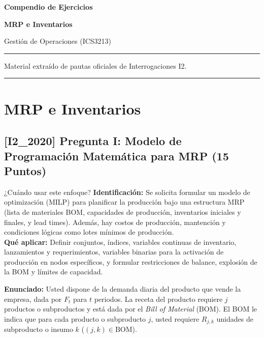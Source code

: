 \documentclass[11pt, a4paper]{article}
\begin{document}
\begin{titlepage}
  \centering
  \vspace*{2cm}
  {\Huge\bfseries\color{gopcyan} Compendio de Ejercicios\par}
  \vspace{0.4cm}
  {\LARGE\bfseries MRP e Inventarios\par}
  \vspace{0.3cm}
  {\large Gestión de Operaciones (ICS3213)\par}
  \vspace{1.2cm}
  \rule{\textwidth}{0.4pt}
  \vspace{0.4cm}
  {\small Material extraído de pautas oficiales de Interrogaciones I2.\par}
  \vspace{0.4cm}
  \rule{\textwidth}{0.4pt}
  \vfill
\end{titlepage}

\newpage
\section*{MRP e Inventarios}

\subsection*{[I2_2020] Pregunta I: Modelo de Programación Matemática para MRP (15 Puntos)}
\begin{tipprueba}{¿Cuándo usar este enfoque?}
    \textbf{Identificación:} Se solicita formular un modelo de optimización (MILP) para planificar la producción bajo una estructura MRP (lista de materiales BOM, capacidades de producción, inventarios iniciales y finales, y lead times). Además, hay costos de producción, mantención y condiciones lógicas como lotes mínimos de producción.\\
    \textbf{Qué aplicar:} Definir conjuntos, índices, variables continuas de inventario, lanzamientos y requerimientos, variables binarias para la activación de producción en nodos específicos, y formular restricciones de balance, explosión de la BOM y límites de capacidad.
  \end{tipprueba}

  \textbf{Enunciado:}
  Usted dispone de la demanda diaria del producto que vende la empresa, dada por $F_t$ para $t$ periodos. La receta del producto requiere $j$ productos o subproductos y está dada por el \textit{Bill of Material} (BOM). El BOM le indica que para cada producto o subproducto $j$, usted requiere $R_{j,k}$ unidades de subproducto o insumo $k$ ($(j, k) \in \text{BOM}$). 
\end{document}
